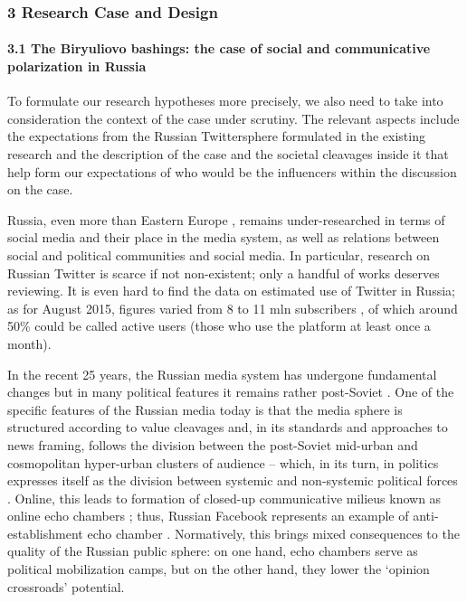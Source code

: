 \subsubsection{3 Research Case and Design}
\paragraph{3.1 The Biryuliovo bashings: the case of social and communicative polarization in Russia}
To formulate our research hypotheses more precisely, we also need to take into consideration the context of the case under scrutiny. The relevant aspects include the expectations from the Russian Twittersphere formulated in the existing research and the description of the case and the societal cleavages inside it that help form our expectations of who would be the influencers within the discussion on the case.

Russia, even more than Eastern Europe \cite{HladikStetka}, remains under-researched in terms of social media and their place in the media system, as well as relations between social and political communities and social media. In particular, research on Russian Twitter is scarce if not non-existent; only a handful of works deserves reviewing. It is even hard to find the data on estimated use of Twitter in Russia; as for August 2015, figures varied from 8 to 11 mln subscribers \cite{Smirnov}, of which around 50\% could be called active users (those who use the platform at least once a month).

In the recent 25 years, the Russian media system has undergone fundamental changes but in many political features it remains rather post-Soviet \cite{Vartanova}. One of the specific features of the Russian media today is that the media sphere is structured according to value cleavages and, in its standards and approaches to news framing, follows the division between the post-Soviet mid-urban and cosmopolitan hyper-urban clusters of audience -- which, in its turn, in politics expresses itself as the division between systemic and non-systemic political forces \cite{BodrunovaLitvinenko2015,BodrunovaLitvinenko2013}. Online, this leads to formation of closed-up communicative milieus known as online echo chambers \cite{Wallsten}; thus, Russian Facebook represents an example of anti-establishment echo chamber \cite{BodrunovaLitvinenko2013}. Normatively, this brings mixed consequences to the quality of the Russian public sphere: on one hand, echo chambers serve as political mobilization camps, but on the other hand, they lower the ‘opinion crossroads’ potential.

